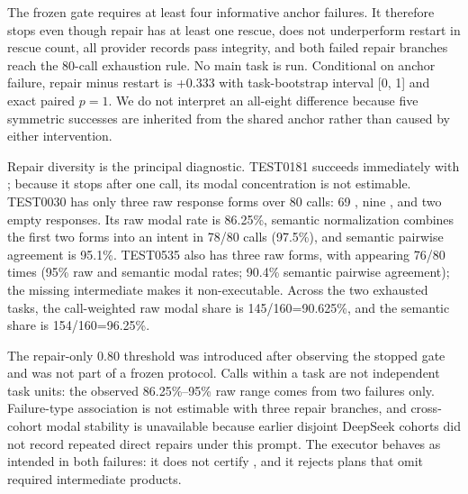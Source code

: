 The frozen gate requires at least four informative anchor failures. It therefore stops even though repair has at least one rescue, does not underperform restart in rescue count, all provider records pass integrity, and both failed repair branches reach the 80-call exhaustion rule. No main task is run. Conditional on anchor failure, repair minus restart is +0.333 with task-bootstrap interval [0, 1] and exact paired \(p=1\). We do not interpret an all-eight difference because five symmetric successes are inherited from the shared anchor rather than caused by either intervention.

Repair diversity is the principal diagnostic. TEST0181 succeeds immediately with \texttt{}; because it stops after one call, its modal concentration is not estimable. TEST0030 has only three raw response forms over 80 calls: 69 \texttt{\detokenize{["IMPOSSIBLE"]}}, nine \texttt{}, and two empty responses. Its raw modal rate is 86.25\%, semantic normalization combines the first two forms into an \texttt{} intent in 78/80 calls (97.5\%), and semantic pairwise agreement is 95.1\%. TEST0535 also has three raw forms, with \texttt{} appearing 76/80 times (95\% raw and semantic modal rates; 90.4\% semantic pairwise agreement); the missing intermediate \texttt{} makes it non-executable. Across the two exhausted tasks, the call-weighted raw modal share is 145/160=90.625\%, and the semantic share is 154/160=96.25\%.

The repair-only 0.80 threshold was introduced after observing the stopped gate and was not part of a frozen protocol. Calls within a task are not independent task units: the observed 86.25\%--95\% raw range comes from two failures only. Failure-type association is not estimable with three repair branches, and cross-cohort modal stability is unavailable because earlier disjoint DeepSeek cohorts did not record repeated direct repairs under this prompt. The executor behaves as intended in both failures: it does not certify \texttt{}, and it rejects plans that omit required intermediate products.

